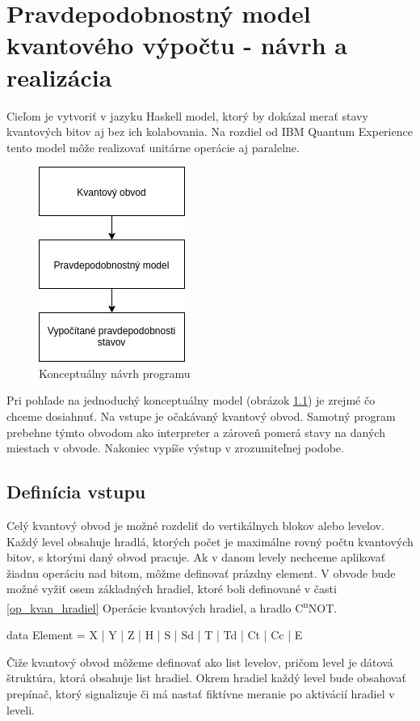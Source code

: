 
\chapter{Pravdepodobnostný model kvantového výpočtu - návrh a realizácia}

Cieľom je vytvoriť v jazyku Haskell model, ktorý by dokázal merať stavy
kvantových bitov aj bez ich kolabovania. Na rozdiel od IBM Quantum
Experience tento model môže realizovať unitárne operácie aj paralelne.

\begin{figure}
	\centering 
	\includegraphics[width=.2\textwidth]{figures/navrh.png} 
	\caption{Konceptuálny návrh programu}
    \label{navrh}
\end{figure}


Pri pohľade na jednoduchý konceptuálny model (obrázok \ref{navrh}) je zrejmé
čo chceme dosiahnuť. Na vstupe je očakávaný kvantový obvod. Samotný program
prebehne týmto obvodom ako interpreter a zároveň pomerá stavy na daných
miestach v obvode. Nakoniec vypíše výstup v zrozumiteľnej podobe.

\section{Definícia vstupu}

Celý kvantový obvod je možné rozdeliť do vertikálnych blokov alebo levelov.
Každý level obsahuje hradlá, ktorých počet je maximálne rovný počtu 
kvantových bitov, s ktorými daný obvod pracuje. Ak v danom levely nechceme
aplikovať žiadnu operáciu nad bitom, môžme definovať prázdny element.
V obvode bude možné vyžiť osem základných hradiel, ktoré boli definované
v časti \ref{op_kvan_hradiel} Operácie kvantových hradiel, a hradlo 
C\textsuperscript{n}NOT.

\begin{code}
data Element = X
    | Y
    | Z
    | H
    | S
    | Sd
    | T
    | Td
    | Ct
    | Cc
    | E
\end{code}

Čiže kvantový obvod môžeme definovať ako list levelov, pričom level je dátová
štruktúra, ktorá obsahuje list hradiel. Okrem hradiel každý level bude
obsahovať prepínač, ktorý signalizuje či má nastať fiktívne meranie po 
aktivácií hradiel v leveli.

